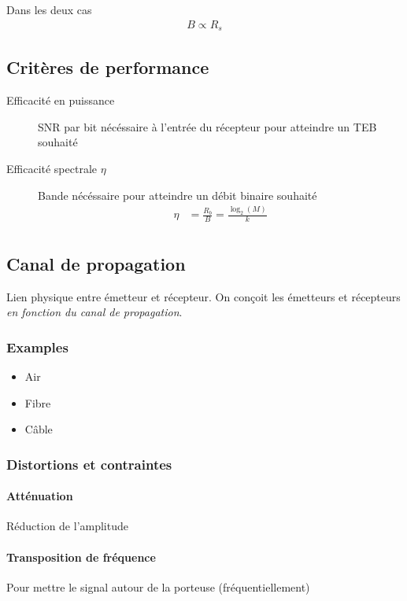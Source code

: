 \documentclass{article}
\begin{document}
Dans les deux cas
\begin{align*}
	B \propto R_s
\end{align*}

\subsection{Critères de performance}

\begin{description}
	\item[Efficacité en puissance] 
SNR par bit nécéssaire à l'entrée du récepteur pour atteindre un TEB souhaité
\item[Efficacité spectrale $\eta$] Bande nécéssaire pour atteindre un débit binaire souhaité
	\begin{align*}
		\eta &= \frac{R_b}{B}= \frac{\log_2(M)}{k} \\
	\end{align*}
\end{description}

\subsection{Canal de propagation}

Lien physique entre émetteur et récepteur.
On conçoit les émetteurs et récepteurs \emph{en fonction du canal de propagation}. 

\subsubsection{Examples}

\begin{itemize}
	\item Air
	\item Fibre
	\item Câble
\end{itemize}

\subsubsection{Distortions et contraintes}

\paragraph{Atténuation}
Réduction de l'amplitude

\paragraph{Transposition de fréquence}
Pour mettre le signal autour de la porteuse (fréquentiellement)
\end{document}
